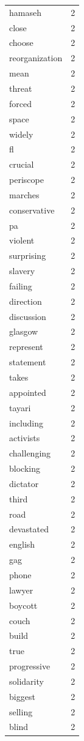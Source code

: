 \begin{tabular}{lr}
hamaseh & 2 \\
close & 2 \\
choose & 2 \\
reorganization & 2 \\
mean & 2 \\
threat & 2 \\
forced & 2 \\
space & 2 \\
widely & 2 \\
fl & 2 \\
crucial & 2 \\
periscope & 2 \\
marches & 2 \\
conservative & 2 \\
pa & 2 \\
violent & 2 \\
surprising & 2 \\
slavery & 2 \\
failing & 2 \\
direction & 2 \\
discussion & 2 \\
glasgow & 2 \\
represent & 2 \\
statement & 2 \\
takes & 2 \\
appointed & 2 \\
tayari & 2 \\
including & 2 \\
activists & 2 \\
challenging & 2 \\
blocking & 2 \\
dictator & 2 \\
third & 2 \\
road & 2 \\
devastated & 2 \\
english & 2 \\
gag & 2 \\
phone & 2 \\
lawyer & 2 \\
boycott & 2 \\
couch & 2 \\
build & 2 \\
true & 2 \\
progressive & 2 \\
solidarity & 2 \\
biggest & 2 \\
selling & 2 \\
blind & 2 \\

\end{tabular}
